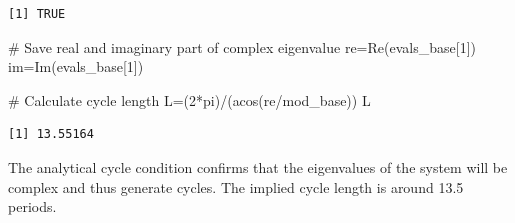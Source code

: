 \documentclass[
  letterpaper,
  DIV=11,
  numbers=noendperiod]{scrreprt}
\newenvironment{Shaded}{\begin{snugshade}}{\end{snugshade}}
\newcommand{\CommentTok}[1]{\textcolor[rgb]{0.37,0.37,0.37}{#1}}
\newcommand{\DecValTok}[1]{\textcolor[rgb]{0.68,0.00,0.00}{#1}}
\newcommand{\FunctionTok}[1]{\textcolor[rgb]{0.28,0.35,0.67}{#1}}
\newcommand{\NormalTok}[1]{\textcolor[rgb]{0.00,0.23,0.31}{#1}}
\newcommand{\OtherTok}[1]{\textcolor[rgb]{0.00,0.23,0.31}{#1}}
\newcommand{\SpecialCharTok}[1]{\textcolor[rgb]{0.37,0.37,0.37}{#1}}
\begin{document}
\begin{verbatim}
[1] TRUE
\end{verbatim}

\begin{Shaded}
\begin{Highlighting}[]
\CommentTok{\# Save real and imaginary part of complex eigenvalue}
\NormalTok{re}\OtherTok{=}\FunctionTok{Re}\NormalTok{(evals\_base[}\DecValTok{1}\NormalTok{])}
\NormalTok{im}\OtherTok{=}\FunctionTok{Im}\NormalTok{(evals\_base[}\DecValTok{1}\NormalTok{])}

\CommentTok{\# Calculate cycle length}
\NormalTok{L}\OtherTok{=}\NormalTok{(}\DecValTok{2}\SpecialCharTok{*}\NormalTok{pi)}\SpecialCharTok{/}\NormalTok{(}\FunctionTok{acos}\NormalTok{(re}\SpecialCharTok{/}\NormalTok{mod\_base))}
\NormalTok{L}
\end{Highlighting}
\end{Shaded}

\begin{verbatim}
[1] 13.55164
\end{verbatim}

The analytical cycle condition confirms that the eigenvalues of the
system will be complex and thus generate cycles. The implied cycle
length is around 13.5 periods.
\end{document}
